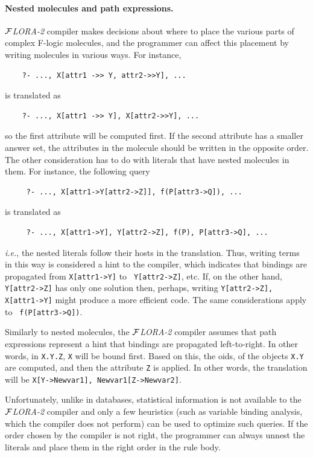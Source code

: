 \documentclass[11pt]{article}
\newcommand{\FLORA}{{\mbox{${\cal F}${\small\it LORA}\rm\emph{-2}}}\xspace}
\begin{document}
\paragraph{Nested molecules and path expressions.}
\FLORA compiler makes decisions about
where to place the various parts of complex F-logic molecules, and the
programmer can affect this placement by writing molecules in various ways.
For instance,
\begin{verbatim}
    ?- ..., X[attr1 ->> Y, attr2->>Y], ...
\end{verbatim}
is translated as
\begin{verbatim}
    ?- ..., X[attr1 ->> Y], X[attr2->>Y], ...  
\end{verbatim}
so the first attribute will be computed first. If the second attribute has
a smaller answer set, the attributes in the molecule should be written in
the opposite order. The other consideration has to do with literals that
have nested molecules in them. For instance, the following query
\begin{verbatim}
     ?- ..., X[attr1->Y[attr2->Z]], f(P[attr3->Q]), ...
\end{verbatim}
is translated as
\begin{verbatim}
     ?- ..., X[attr1->Y], Y[attr2->Z], f(P), P[attr3->Q], ...
\end{verbatim}
{\it i.e.}, the nested literals follow their hosts in the translation.
Thus, writing terms in this way is considered a hint to the compiler, which
indicates that bindings are propagated from {\tt X[attr1->Y]} to {\tt
  Y[attr2->Z]}, etc. If, on the other hand, {\tt Y[attr2->Z]} has only one
solution then, perhaps, writing {\tt Y[attr2->Z], X[attr1->Y]} might
produce a more efficient code.  The same considerations apply to {\tt
  f(P[attr3->Q])}.

Similarly to nested molecules, the \FLORA compiler assumes that path
expressions represent a hint that bindings are propagated left-to-right.
In other words, in {\tt X.Y.Z}, {\tt X} will be bound first.
Based on this, the oids, of the objects {\tt X.Y} are computed, and
then the attribute {\tt Z} is applied. In other words, the translation will
be {\tt X[Y->Newvar1], Newvar1[Z->Newvar2]}.

Unfortunately, unlike in databases, statistical information is not
available to the \FLORA compiler and only a few heuristics (such as
variable binding analysis, which the compiler does not perform) can be used
to optimize such queries. If the order chosen by the compiler is not right,
the programmer can always unnest the literals and place them in the right
order in the rule body.
\end{document}
